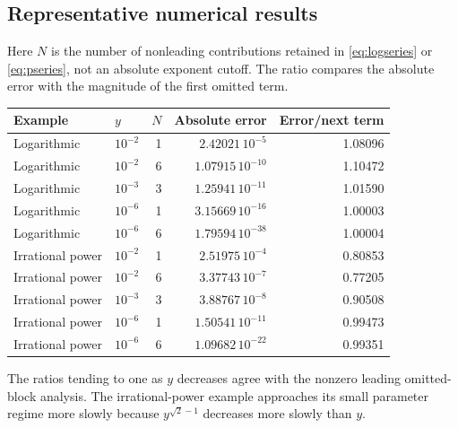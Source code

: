 \documentclass[11pt,a4paper]{article}
\theoremstyle{definition}
\begin{document}
\subsection{Representative numerical results}
Here \(N\) is the number of nonleading contributions retained in
\eqref{eq:logseries} or \eqref{eq:pseries}, not an absolute exponent cutoff.
The ratio compares the absolute error with the magnitude of the first
omitted term.
\begin{center}
\begin{tabular}{@{}llrrr@{}}
\toprule
Example & \(y\) & \(N\) & Absolute error & Error/next term\\\midrule
Logarithmic & \(10^{-2}\) & 1 & \(2.42021\,10^{-5}\) & 1.08096\\
Logarithmic & \(10^{-2}\) & 6 & \(1.07915\,10^{-10}\) & 1.10472\\
Logarithmic & \(10^{-3}\) & 3 & \(1.25941\,10^{-11}\) & 1.01590\\
Logarithmic & \(10^{-6}\) & 1 & \(3.15669\,10^{-16}\) & 1.00003\\
Logarithmic & \(10^{-6}\) & 6 & \(1.79594\,10^{-38}\) & 1.00004\\\addlinespace
Irrational power & \(10^{-2}\) & 1 & \(2.51975\,10^{-4}\) & 0.80853\\
Irrational power & \(10^{-2}\) & 6 & \(3.37743\,10^{-7}\) & 0.77205\\
Irrational power & \(10^{-3}\) & 3 & \(3.88767\,10^{-8}\) & 0.90508\\
Irrational power & \(10^{-6}\) & 1 & \(1.50541\,10^{-11}\) & 0.99473\\
Irrational power & \(10^{-6}\) & 6 & \(1.09682\,10^{-22}\) & 0.99351\\
\bottomrule
\end{tabular}
\end{center}
The ratios tending to one as \(y\) decreases agree with the nonzero leading
omitted-block analysis. The irrational-power example approaches its small
parameter regime more slowly because \(y^{\sqrt2-1}\) decreases more slowly
than \(y\).
\end{document}
